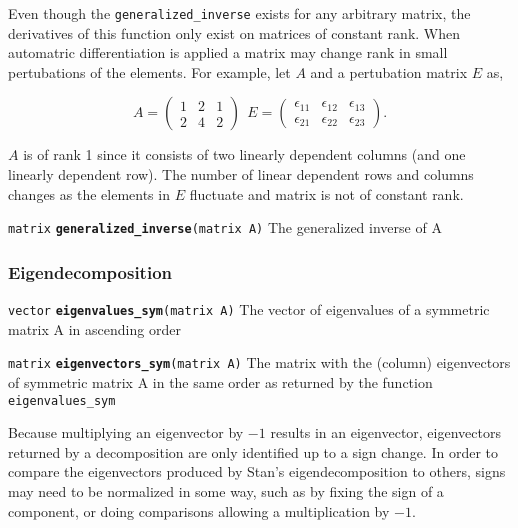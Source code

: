 \documentclass[
  10pt,
]{book}
\begin{document}
Even though the \texttt{generalized\_inverse} exists for
any arbitrary matrix, the derivatives of this function only exist
on matrices of constant rank. When automatric differentiation is applied
a matrix may change rank in small pertubations of the elements. For example,
let \(A\) and a pertubation matrix \(E\) as,

\[
A = \left( 
    \begin{array}{cccc} 
    1 & 2 & 1 \\
    2 & 4 & 2 
    \end{array} 
    \right)
\: \:
E = \left( 
    \begin{array}{cccc} 
    \epsilon_{11} & \epsilon_{12} & \epsilon_{13} \\
    \epsilon_{21} & \epsilon_{22} & \epsilon_{23}
    \end{array} 
    \right).
\]

\(A\) is of rank 1 since it consists of two linearly dependent columns (and one
linearly dependent row). The number of linear dependent rows and columns changes
as the elements in \(E\) fluctuate and matrix is not of constant rank.


\texttt{matrix} \textbf{\texttt{generalized\_inverse}}\texttt{(matrix\ A)}\newline
The generalized inverse of A

\hypertarget{eigendecomposition}{%
\subsubsection{Eigendecomposition}\label{eigendecomposition}}


\texttt{vector} \textbf{\texttt{eigenvalues\_sym}}\texttt{(matrix\ A)}\newline
The vector of eigenvalues of a symmetric matrix A in ascending order


\texttt{matrix} \textbf{\texttt{eigenvectors\_sym}}\texttt{(matrix\ A)}\newline
The matrix with the (column) eigenvectors of symmetric matrix A in the
same order as returned by the function \texttt{eigenvalues\_sym}

Because multiplying an eigenvector by \(-1\) results in an eigenvector,
eigenvectors returned by a decomposition are only identified up to a
sign change. In order to compare the eigenvectors produced by Stan's
eigendecomposition to others, signs may need to be normalized in some
way, such as by fixing the sign of a component, or doing comparisons
allowing a multiplication by \(-1\).
\end{document}

